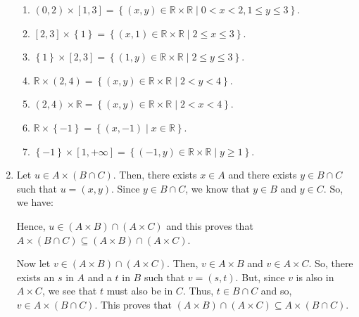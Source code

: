 \begin{enumerate}
\begin{enumerate}
\item $\left( 0, 2 \right) \times \left[ 1, 3 \right] = \left\{ \left( x, y \right) \in \mathbb{R} \times \mathbb{R} \mid 0 < x < 2, 1 \leq y \leq 3 \right\}$.

\item $\left[ 2, 3 \right] \times \left\{ 1 \right\} = \left\{ \left( x, 1 \right) \in \mathbb{R} \times \mathbb{R} \mid 2 \leq x \leq 3 \right\}$.

\item $\left\{ 1 \right\} \times \left[ 2, 3 \right] = \left\{ \left( 1, y \right) \in \mathbb{R} \times \mathbb{R} \mid 2 \leq y \leq 3 \right\}$.

\item $\mathbb{R} \times \left( 2, 4 \right) = \left\{ \left( x, y \right) \in \mathbb{R} \times \mathbb{R} \mid 2 < y < 4 \right\}$.

\item $\left( 2, 4 \right) \times \mathbb{R} = \left\{ \left( x, y \right) \in \mathbb{R} \times \mathbb{R} \mid 2 < x < 4 \right\}$.

\item $\mathbb{R} \times \left\{ -1 \right\} = \left\{ \left( x, -1 \right) \mid x \in \mathbb{R} \right\}$.

\item $\left\{ -1 \right\} \times \left[ 1, +\infty \right] = \left\{ \left( -1, y \right) \in \mathbb{R} \times \mathbb{R} \mid y \geq 1 \right\}$.
\end{enumerate}

\item Let $u \in A \times \left( {B \cap C} \right)$. Then, there exists $x \in A$ and there exists  $y \in B \cap C$ such that  $u = \left( {x, y} \right)$.  Since  $y \in B \cap C$, we know that  $y \in B$ and  $y \in C$.  So,  we have:
Hence, $u \in \left( A \times B \right) \cap \left( A \times C \right)$ and this proves that 
$A \times \left( {B \cap C} \right) \subseteq \left( A \times B \right) \cap \left( A \times C \right)$.

Now let $v \in \left( A \times B \right) \cap \left( A \times C \right)$.  Then, 
$v \in A \times B$ and $v \in A \times C$.  So, there exists an $s$ in $A$ and a $t$ in $B$ such that $v = \left( s, t \right)$.  But, since $v$ is also in $A \times C$, we see that $t$ must also be in $C$.  Thus, $t \in B \cap C$ and so, $v \in A \times \left( B \cap C \right)$.  This proves that $\left( A \times B \right) \cap \left( A \times C \right) \subseteq A \times \left( B \cap C \right)$.


\end{enumerate}
